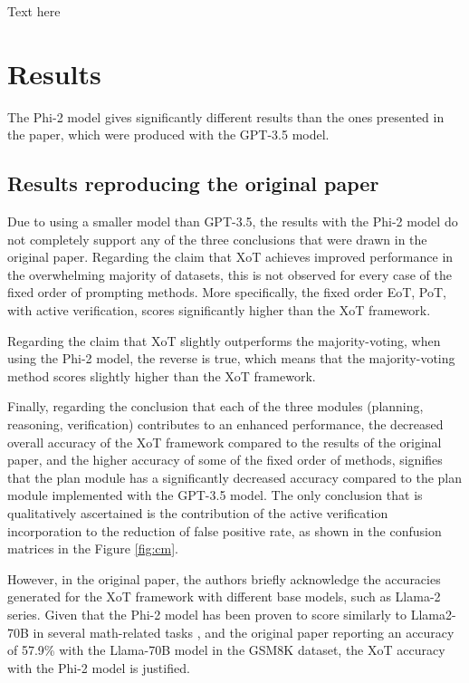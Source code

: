 \documentclass[10pt]{article} %
\begin{document}
Text here

\section{Results}
The Phi-2 model gives significantly different results than the ones presented in the paper, which were produced with the GPT-3.5 model.

\subsection{Results reproducing the original paper}

Due to using a smaller model than GPT-3.5, the results with the Phi-2 model do not completely support any of the three conclusions that were drawn in the original paper. Regarding the claim that XoT achieves improved performance in the overwhelming majority of datasets, this is not observed for every case of the fixed order of prompting methods. More specifically, the fixed order EoT, PoT, with active verification, scores significantly higher than the XoT framework. 

Regarding the claim that XoT slightly outperforms the majority-voting, when using the Phi-2 model, the reverse is true, which means that the majority-voting method scores slightly higher than the XoT framework. 

Finally, regarding the conclusion that each of the three modules (planning, reasoning, verification) contributes to an enhanced performance, the decreased overall accuracy of the XoT framework compared to the results of the original paper, and the higher accuracy of some of the fixed order of methods, signifies that the plan module has a significantly decreased accuracy compared to the plan module implemented with the GPT-3.5 model. The only conclusion that is qualitatively ascertained is the contribution of the active verification incorporation to the reduction of false positive rate, as shown in the confusion matrices in the Figure \ref{fig:cm}.

However, in the original paper, the authors briefly acknowledge the accuracies generated for the XoT framework with different base models, such as Llama-2 series. Given that the Phi-2 model has been proven to score similarly to Llama2-70B in several math-related tasks \citep{microsoft2023phi2}, and the original paper reporting an accuracy of 57.9\% with the Llama-70B model in the GSM8K dataset, the XoT accuracy with the Phi-2 model is justified.
\end{document}
